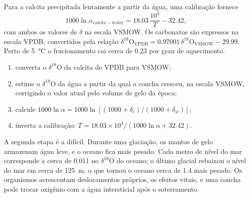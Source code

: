 Para a calcita precipitada lentamente a partir da água, uma calibração fornece
\[
1000\ln\alpha_{\mathrm{calcite-water}} = 18.03\,\frac{10^3}{T} - 32.42,
\]
com ambos os valores de $\delta$ na escala VSMOW. Os carbonatos são expressos na
escala VPDB, convertidos pela relação $\delta^{18}\mathrm O_{\mathrm{VPDB}} =
0.97001\,\delta^{18}\mathrm O_{\mathrm{VSMOW}} - 29.99$. Perto de \qty{5}{\celsius} o
fracionamento cai cerca de \qty{0.23}{\permil} por grau de aquecimento.

\begin{method}\label{met:b3:stable-isotopes:palaeotemperature}
\begin{enumerate}
\item converta o $\delta^{18}\mathrm O$ da calcita de VPDB para VSMOW;
\item estime o $\delta^{18}\mathrm O$ da água a partir da qual a concha cresceu, na
escala VSMOW, corrigindo o valor atual pelo volume de gelo da época;
\item calcule $1000\ln\alpha = 1000\ln[(1000 + \delta_c)/(1000 + \delta_w)]$;
\item inverta a calibração: $T = 18.03\times10^3/(1000\ln\alpha + 32.42)$.
\end{enumerate}
\end{method}

A segunda etapa é a difícil. Durante uma glaciação, os mantos de gelo
armazenam água leve, e o oceano fica mais pesado. Cada metro de nível do mar corresponde
a cerca de \qty{0.011}{\permil} no $\delta^{18}\mathrm O$ do oceano; o último glacial
rebaixou o nível do mar em cerca de \qty{125}{m}, o que tornou o oceano cerca de
\qty{1.4}{\permil} mais pesado. Os organismos acrescentam deslocamentos próprios, os
efeitos vitais, e uma concha pode trocar oxigênio com a água intersticial após o soterramento.

